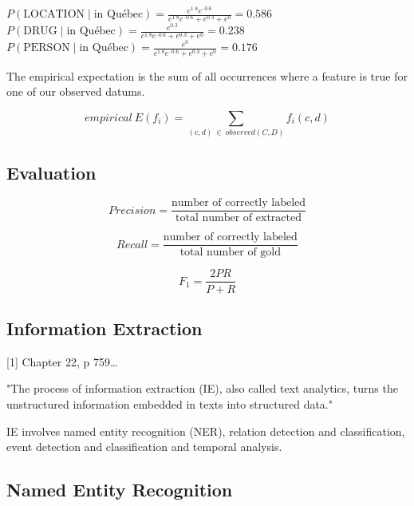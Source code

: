 $P(\text{LOCATION} \mid \text{in Québec}) = \frac{e^{1.8} e^{–0.6}}{e^{1.8} e^{–0.6} + e^{0.3} + e^0} = 0.586$\\
$P(\text{DRUG} \mid \text{in Québec}) = \frac{e^{0.3}}{e^{1.8} e^{–0.6} + e^{0.3} + e^0} = 0.238$\\
$P(\text{PERSON} \mid \text{in Québec}) = \frac{e^0}{e^{1.8} e^{–0.6} + e^{0.3} + e^0} = 0.176$

The empirical expectation is the sum of all occurrences where a feature is true for one of our observed datums.

\begin{equation}
  empirical \ E(f_i)= \sum_{(c,d) \ \in \ observed(C,D)}f_i(c,d)
  \label{eq:epirical}
\end{equation}


\subsection*{Evaluation}

\begin{equation}
  Precision = \frac{\text{number of correctly labeled}}{\text{total number of extracted}}
  \label{eq:preci}
\end{equation}

\begin{equation}
  Recall = \frac{\text{number of correctly labeled}}{\text{total number of gold}}
  \label{eq:reca}
\end{equation}

\begin{equation}
  F_1 = \frac{2PR}{P+R}
  \label{eq:f1mes}
\end{equation}


\subsection*{Information Extraction}

[1] Chapter 22, p 759…

"The process of information extraction (IE), also called text analytics, turns the unstructured information embedded in texts into structured data."

IE involves named entity recognition (NER), relation detection and classification, event detection and classification and temporal analysis.


\subsection*{Named Entity Recognition}

